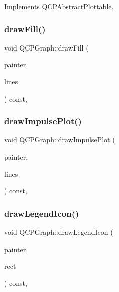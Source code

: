 Implements \mbox{\hyperlink{class_q_c_p_abstract_plottable_a453f676a5cee7bf846c5f0fa05ea84b3}{Q\+C\+P\+Abstract\+Plottable}}.

\mbox{\label{class_q_c_p_graph_a67c5ea573f604efd8bf121a0b7a380d1}} 
\subsubsection{\texorpdfstring{drawFill()}{drawFill()}}
{\footnotesize\ttfamily void Q\+C\+P\+Graph\+::draw\+Fill (\begin{DoxyParamCaption}\item[{\mbox{\hyperlink{class_q_c_p_painter}{Q\+C\+P\+Painter}} $\ast$}]{painter,  }\item[{Q\+Vector$<$ Q\+PointF $>$ $\ast$}]{lines }\end{DoxyParamCaption}) const\hspace{0.3cm}{\ttfamily [protected]}, {\ttfamily [virtual]}}

\mbox{\label{class_q_c_p_graph_a217ef6bf6c5689eb1dcbe02187d2cc61}} 
\subsubsection{\texorpdfstring{drawImpulsePlot()}{drawImpulsePlot()}}
{\footnotesize\ttfamily void Q\+C\+P\+Graph\+::draw\+Impulse\+Plot (\begin{DoxyParamCaption}\item[{\mbox{\hyperlink{class_q_c_p_painter}{Q\+C\+P\+Painter}} $\ast$}]{painter,  }\item[{const Q\+Vector$<$ Q\+PointF $>$ \&}]{lines }\end{DoxyParamCaption}) const\hspace{0.3cm}{\ttfamily [protected]}, {\ttfamily [virtual]}}

\mbox{\label{class_q_c_p_graph_a6efbab06c400bdb15e28b2d0a4ecc18a}} 
\subsubsection{\texorpdfstring{drawLegendIcon()}{drawLegendIcon()}}
{\footnotesize\ttfamily void Q\+C\+P\+Graph\+::draw\+Legend\+Icon (\begin{DoxyParamCaption}\item[{\mbox{\hyperlink{class_q_c_p_painter}{Q\+C\+P\+Painter}} $\ast$}]{painter,  }\item[{const Q\+RectF \&}]{rect }\end{DoxyParamCaption}) const\hspace{0.3cm}{\ttfamily [protected]}, {\ttfamily [virtual]}}



